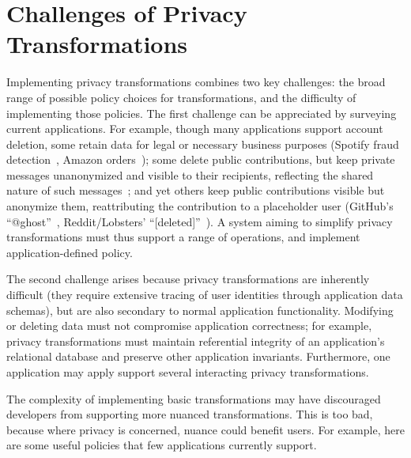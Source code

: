 \section{Challenges of Privacy Transformations}
\label{sec:motivation}
%

%
Implementing privacy transformations combines two key challenges: the broad
range of possible policy choices for transformations, and the difficulty of
implementing those policies.
%
The first challenge can be appreciated by surveying current applications.
%
For example, though many applications support account deletion,
some retain
data for legal or necessary business purposes (\eg Spotify fraud detection~\cite{spotify:privacy},
Amazon orders~\cite{amazon:privacy}); some delete public contributions, but keep private
messages unanonymized and visible to their recipients, reflecting the
shared nature of such messages~\cite{facebook:privacy, twitter:privacy};
and yet others keep public contributions visible but anonymize them, reattributing the contribution
to a placeholder user (\eg GitHub's ``@ghost''~\cite{github:privacy}, Reddit/Lobsters'
``[deleted]''~\cite{reddit:privacy, lobsters:privacy}).
%
A system aiming to simplify privacy transformations must thus support a range
of operations, and implement application-defined policy.


The second challenge arises because privacy transformations are
inherently difficult (they require extensive tracing of user identities through
application data schemas), but are also secondary to normal application
functionality.
%
Modifying or deleting data must not compromise application correctness; for example, privacy
transformations must maintain referential integrity of an application's relational database
and preserve other application invariants.
%
Furthermore, one application may apply support several interacting privacy
transformations.


The complexity of implementing basic transformations may have discouraged
developers from supporting more nuanced transformations.
%
This is too bad, because where privacy is concerned, nuance could benefit 
users.
%
For example, here are some useful policies that few applications currently
support.

